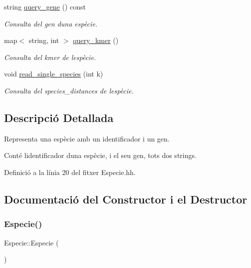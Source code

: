 \begin{DoxyCompactItemize}
string \hyperlink{class_especie_a0781a594e45e036c0b59d161a7ebd8f3}{query\+\_\+gene} () const
\begin{DoxyCompactList}\small\item\em Consulta del gen d\textquotesingle{}una espècie. \end{DoxyCompactList}\item 
map$<$ string, int $>$ \hyperlink{class_especie_ab446000c51668cabe39fb2b72ed5fff0}{query\+\_\+kmer} ()
\begin{DoxyCompactList}\small\item\em Consulta del kmer de l\textquotesingle{}espècie. \end{DoxyCompactList}\item 
void \hyperlink{class_especie_a1a60c5306ae621527bb9183a5c64583f}{read\+\_\+single\+\_\+species} (int k)
\begin{DoxyCompactList}\small\item\em Consulta del species\+\_\+distances de l\textquotesingle{}espècie. \end{DoxyCompactList}\end{DoxyCompactItemize}


\subsection{Descripció Detallada}
Representa una espècie amb un identificador i un gen. 

Conté l\textquotesingle{}identificador d\textquotesingle{}una espècie, i el seu gen, tots dos strings. 

Definició a la línia 20 del fitxer Especie.\+hh.



\subsection{Documentació del Constructor i el Destructor}
\mbox{\label{class_especie_a272c2488719cc9874b2f174906675b3d}} 
\subsubsection{\texorpdfstring{Especie()}{Especie()}\hspace{0.1cm}{\footnotesize\ttfamily [1/2]}}
{\footnotesize\ttfamily Especie\+::\+Especie (\begin{DoxyParamCaption}{ }\end{DoxyParamCaption})}




